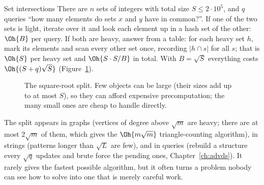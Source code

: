 \begin{problem}{Set intersections}
There are $n$ sets of integers with total size $S \le 2\cdot10^5$, and $q$ queries ``how many elements do sets $x$ and $y$
have in common?''.
\solution If one of the two sets is light, iterate over it and look each element up in a hash set of the other: $\Oh{B}$
per query. If both are heavy, answer from a table: for each heavy set $h$, mark its elements and scan every other set once,
recording $|h \cap s|$ for all $s$; that is $\Oh{S}$ per heavy set and $\Oh{S \cdot S / B}$ in total. With $B = \sqrt S$
everything costs $\Oh{(S + q)\sqrt S}$ (Figure~\ref{fig:heavylight}).
\end{problem}

\begin{figure}[htbp]
\centering
{}
\caption{The square-root split. Few objects can be large (their sizes add up to at most $S$), so they can afford expensive
precomputation; the many small ones are cheap to handle directly.}
\label{fig:heavylight}
\end{figure}

The split appears in graphs (vertices of degree above $\sqrt m$ are heavy; there are at most $2\sqrt m$ of them, which gives
the $\Oh{m\sqrt m}$ triangle-counting algorithm), in strings (patterns longer than $\sqrt L$ are few), and in queries
(rebuild a structure every $\sqrt q$ updates and brute force the pending ones, Chapter~\ref{ch:advds}). It rarely gives the
fastest possible algorithm, but it often turns a problem nobody can see how to solve into one that is merely careful work.

